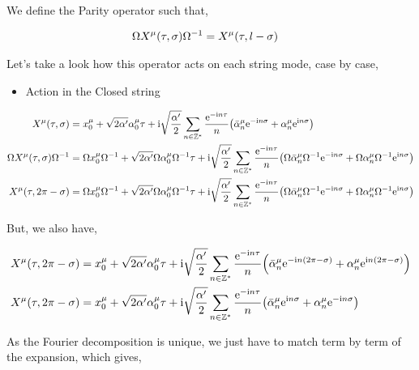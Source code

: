 \problem{}
\probitem{}

We define the Parity operator such that,

\begin{align*}
    \Omega X^\mu\qty(\tau,\sigma)\Omega^{-1}&=X^\mu\qty(\tau,l-\sigma)
\end{align*}

Let's take a look how this operator acts on each string mode, case by case,

\begin{itemize}
    \item Action in the Closed string
\end{itemize}
\begin{align*}
    X^\mu\qty(\tau,\sigma)&=x^\mu_0+\sqrt{2\alpha'}\alpha^\mu_0\tau+\textnormal{i} \sqrt{\frac{\alpha'}{2}}\sum\limits_{n\in\mathbb Z^\ast}\frac{\textnormal{e}^{-\textnormal{i} n\tau}}{n}\qty({\bar\alpha}^\mu_n\textnormal{e}^{-\textnormal{i} n\sigma}+{\alpha}^\mu_n\textnormal{e}^{\textnormal{i} n\sigma})\\
    \Omega X^\mu\qty(\tau,\sigma)\Omega^{-1}&=\Omega x^\mu_0\Omega^{-1}+\sqrt{2\alpha'}\Omega\alpha^\mu_0\Omega^{-1}\tau+\textnormal{i} \sqrt{\frac{\alpha'}{2}}\sum\limits_{n\in\mathbb Z^\ast}\frac{\textnormal{e}^{-\textnormal{i} n\tau}}{n}\qty(\Omega{\bar\alpha}^\mu_n\Omega^{-1}\textnormal{e}^{-\textnormal{i} n\sigma}+\Omega{\alpha}^\mu_n\Omega^{-1}\textnormal{e}^{\textnormal{i} n\sigma})\\
    X^\mu\qty(\tau,2\pi-\sigma)&=\Omega x^\mu_0\Omega^{-1}+\sqrt{2\alpha'}\Omega\alpha^\mu_0\Omega^{-1}\tau+\textnormal{i} \sqrt{\frac{\alpha'}{2}}\sum\limits_{n\in\mathbb Z^\ast}\frac{\textnormal{e}^{-\textnormal{i} n\tau}}{n}\qty(\Omega{\bar\alpha}^\mu_n\Omega^{-1}\textnormal{e}^{-\textnormal{i} n\sigma}+\Omega{\alpha}^\mu_n\Omega^{-1}\textnormal{e}^{\textnormal{i} n\sigma})
\end{align*}

But, we also have,

\begin{align*}
    X^\mu\qty(\tau,2\pi-\sigma)&=x^\mu_0+\sqrt{2\alpha'}\alpha^\mu_0\tau+\textnormal{i} \sqrt{\frac{\alpha'}{2}}\sum\limits_{n\in\mathbb Z^\ast}\frac{\textnormal{e}^{-\textnormal{i} n\tau}}{n}\qty({\bar\alpha}^\mu_n\textnormal{e}^{-\textnormal{i} n\qty(2\pi-\sigma)}+{\alpha}^\mu_n\textnormal{e}^{\textnormal{i} n\qty(2\pi-\sigma)})\\
    X^\mu\qty(\tau,2\pi-\sigma)&=x^\mu_0+\sqrt{2\alpha'}\alpha^\mu_0\tau+\textnormal{i} \sqrt{\frac{\alpha'}{2}}\sum\limits_{n\in\mathbb Z^\ast}\frac{\textnormal{e}^{-\textnormal{i} n\tau}}{n}\qty({\bar\alpha}^\mu_n\textnormal{e}^{\textnormal{i} n\sigma}+{\alpha}^\mu_n\textnormal{e}^{-\textnormal{i} n\sigma})
\end{align*}

As the Fourier decomposition is unique, we just have to match term by term of the expansion, which gives,

